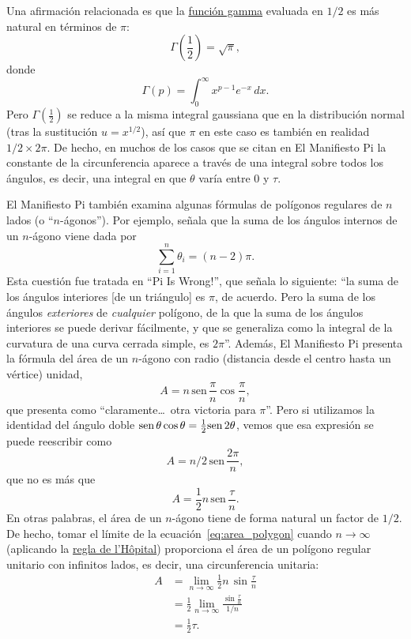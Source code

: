 Una afirmación relacionada es que la \href{http://mathworld.wolfram.com/GammaFunction.html}{función gamma} evaluada en $1/2$ es más natural en términos de $\pi$:
\[
\Gamma(\textstyle{\frac{1}{2}}) = \sqrt{\pi},
\]
donde
\begin{equation}
\label{eq:gamma}
\Gamma(p) = \int_{0}^{\infty} x^{p-1} e^{-x}\,dx.
\end{equation}
Pero $\Gamma(\frac{1}{2})$ se reduce a la misma integral gaussiana que en la distribución normal (tras la sustitución $u = x^{1/2}$), así que $\pi$ en este caso es también en realidad $1/2\times 2\pi$. De hecho, en muchos de los casos que se citan en El Manifiesto Pi la constante de la circunferencia aparece a través de una integral sobre todos los ángulos, es decir, una integral en que $\theta$ varía entre $0$ y $\tau$.

El Manifiesto Pi también examina algunas fórmulas de polígonos regulares de $n$ lados (o ``$n$-ágonos''). Por ejemplo, señala que la suma de los ángulos internos de un $n$-ágono viene dada por
\[
\sum_{i=1}^n \theta_i=(n-2)\pi.
\]
Esta cuestión fue tratada en ``Pi Is Wrong!'', que señala lo siguiente: ``la suma de los ángulos interiores [de un triángulo] es $\pi$, de acuerdo. Pero la suma de los ángulos \emph{exteriores} de \emph{cualquier} polígono, de la que la suma de los ángulos interiores se puede derivar fácilmente, y que se generaliza como la integral de la curvatura de una curva cerrada simple, es $2\pi$''. Además, El Manifiesto Pi presenta la fórmula del área de un $n$-ágono con radio (distancia desde el centro hasta un vértice) unidad,
\[ A=n\,\mbox{sen}\,\frac{\pi}{n}\cos\frac{\pi}{n}, \]
que presenta como ``claramente\ldots\ otra victoria para $\pi$''. Pero si utilizamos la identidad del ángulo doble $\mbox{sen}\,\theta\cos\theta = \frac{1}{2} \mbox{sen}\, 2\theta$, vemos que esa expresión se puede reescribir como
\[ A = n/2\, \mbox{sen}\,\frac{2\pi}{n}, \]
que no es más que
\begin{equation}
\label{eq:area_polygon}
A = \frac{1}{2} n\, \mbox{sen}\,\frac{\tau}{n}.
\end{equation}
En otras palabras, el área de un $n$-ágono tiene de forma natural un factor de $1/2$. De hecho, tomar el límite de la ecuación~\eqref{eq:area_polygon} cuando $n\rightarrow \infty$ (aplicando la \href{http://mathworld.wolfram.com/LHospitalsRule.html}{regla de l'H\^{o}pital}) proporciona el área de un polígono regular unitario con infinitos lados, es decir, una circunferencia unitaria:
\begin{equation}
\label{eq:lhopital}
\begin{split}
A & = \lim_{n\rightarrow\infty} \frac{1}{2} n\, \sin\frac{\tau}{n} \\
  & = \frac{1}{2} \lim_{n\rightarrow\infty} \frac{\sin\frac{\tau}{n}}{1/n} \\
  & = \tfrac{1}{2}\tau.
\end{split}
\end{equation}

